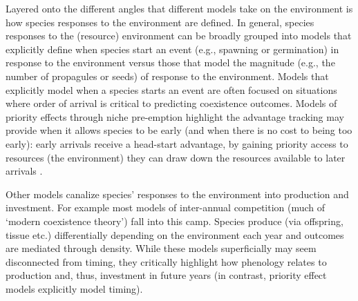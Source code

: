 \documentclass[11pt,letterpaper]{article}
\begin{document}
Layered onto the different angles that different models take on the environment is how species responses to the environment are defined. In general, species responses to the (resource) environment can be broadly grouped into models that explicitly define when species start an event (e.g., spawning or germination) in response to the environment versus those that model the magnitude (e.g., the number of propagules or seeds) of response to the environment. Models that explicitly model when a species starts an event are often focused on situations where order of arrival is critical to predicting coexistence outcomes. Models of priority effects through niche pre-emption highlight the advantage tracking may provide when it allows species to be early (and when there is no cost to being too early): early arrivals receive a head-start advantage, by gaining priority access to resources (the environment) they can draw down the resources available to later arrivals \citep{fukami2015}.

Other models canalize species' responses to the environment into production and investment. For example most models of inter-annual competition (much of `modern coexistence theory') fall into this camp. Species produce (via offspring, tissue etc.) differentially depending on the environment each year and outcomes are mediated through density. While these models superficially may seem disconnected from timing, they critically highlight how phenology relates to production and, thus, investment in future years (in contrast, priority effect models explicitly model timing). %
\end{document}
